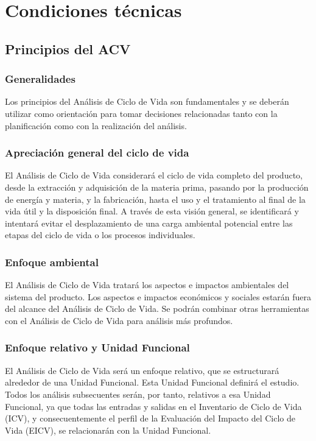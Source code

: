 
\setcounter{chapter}{0}
\chapter{Condiciones técnicas}

\section{Principios del ACV}
\subsection{Generalidades}

Los principios del Análisis de Ciclo de Vida son fundamentales y se deberán utilizar como orientación para tomar decisiones relacionadas tanto con la planificación como con la realización del análisis.

\subsection{Apreciación general del ciclo de vida}

El Análisis de Ciclo de Vida considerará el ciclo de vida completo del producto, desde la extracción y adquisición de la materia prima, pasando por la producción de energía y materia, y la fabricación, hasta el uso y el tratamiento al final de la vida útil y la disposición final. A través de esta visión general, se identificará y intentará evitar el desplazamiento de una carga ambiental potencial entre las etapas del ciclo de vida o los procesos individuales.

\subsection{Enfoque ambiental}
El Análisis de Ciclo de Vida tratará los aspectos e impactos ambientales del sistema del producto. Los aspectos e impactos económicos y sociales estarán fuera del alcance del Análisis de Ciclo de Vida. Se podrán combinar otras herramientas con el Análisis de Ciclo de Vida para análisis más profundos.

\subsection{Enfoque relativo y Unidad Funcional}
El Análisis de Ciclo de Vida será un enfoque relativo, que se estructurará alrededor de una Unidad Funcional. Esta Unidad Funcional definirá el estudio. Todos los análisis subsecuentes serán, por tanto, relativos a esa Unidad Funcional, ya que todas las entradas y salidas en el Inventario de Ciclo de Vida (ICV), y consecuentemente el perfil de la Evaluación del Impacto del Ciclo de Vida (EICV), se relacionarán con la Unidad Funcional.

